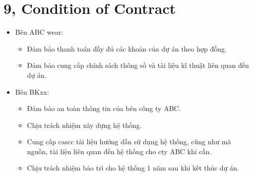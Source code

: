 \documentclass[a4paper,11pt]{report}
\begin{document}
\section*{9, Condition of Contract}
\begin{itemize}
\item Bên ABC wear:
\begin{itemize}
\item Đảm bảo thanh toán đầy đủ các khoản của dự án theo hợp đồng.
\item Đảm bảo cung cấp chính sách thông số và tài liệu kĩ thuật liên quan đến dự án.
\end{itemize}
\item Bên BKxx:
\begin{itemize}
\item Đảm bảo an toàn thông tin của bên công ty ABC.
\item Chịu trách nhiệm xây dựng hệ thống.
\item Cung cấp cascc tài liệu hướng dẫn sử dụng hệ thống, cũng như mã nguồn, tài liệu liên quan đến hệ thống cho cty ABC khi cần.
\item Chịu trách nhiệm bảo trì cho hệ thống 1 năm sau khi kết thúc dự án.
\end{itemize}
\end{itemize}
\end{document}
